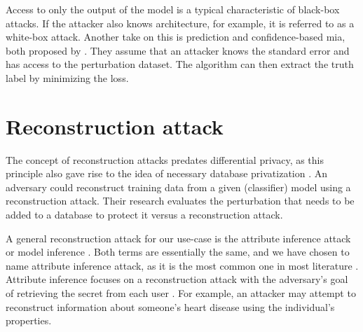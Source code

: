 Access to only the output of the model is a typical characteristic of black-box attacks. If the attacker also knows architecture, for example, it is referred to as a white-box attack.
Another take on this is prediction and confidence-based \gls{mia}, both proposed by \citep{yeom_privacy_2018}.
They assume that an attacker knows the standard error and has access to the perturbation dataset.
The algorithm can then extract the truth label by minimizing the loss. \newline






\newpage
\section{Reconstruction attack}
The concept of reconstruction attacks predates differential privacy, as this principle also gave rise to the idea of necessary database privatization \citep{dinur_revealing_2003}.
An adversary could reconstruct training data from a given (classifier) model using a reconstruction attack.
Their research evaluates the perturbation that needs to be added to a database to protect it versus a reconstruction attack.

A general reconstruction attack for our use-case is the attribute inference attack \citep{dwork_exposed_2017} or model inference \citep{rigaki_survey_2021}.
Both terms are essentially the same, and we have chosen to name attribute inference attack, as it is the most common one in most literature \citep{jegorova_survey_2022}.
Attribute inference focuses on a reconstruction attack with the adversary's goal of retrieving the secret from each user \citep{dwork_exposed_2017}.
For example, an attacker may attempt to reconstruct information about someone's heart disease using the individual's properties.

